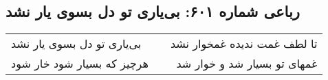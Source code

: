\begin{center}
\section*{رباعی شماره ۶۰۱: بی‌یاری تو دل بسوی یار نشد}
\label{sec:0601}
\begin{longtable}{l p{0.5cm} r}
بی‌یاری تو دل بسوی یار نشد
&&
تا لطف غمت ندیده غمخوار نشد
\\
هرچیز که بسیار شود خار شود
&&
غمهای تو بسیار شد و خوار شد
\\
\end{longtable}
\end{center}
